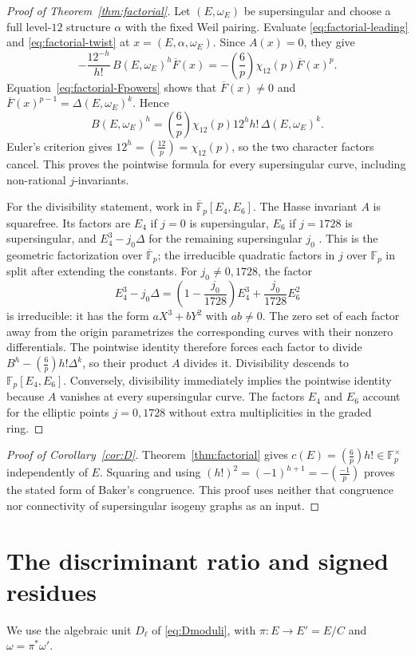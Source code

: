 \documentclass[11pt,a4paper]{article}
\numberwithin{equation}{section}
\theoremstyle{definition}
\theoremstyle{remark}
\newcommand{\Fp}{\mathbb F_p}
\newcommand{\Fb}{\overline{\mathbb F}_p}
\newcommand{\leg}[2]{\left(\frac{#1}{#2}\right)}
\newcommand{\Lp}[1]{\left(\frac{#1}{p}\right)}
\begin{document}
\begin{proof}[Proof of Theorem~\ref{thm:factorial}]
Let $(E,\omega_E)$ be supersingular and choose a full level-$12$
structure $\alpha$ with the fixed Weil pairing. Evaluate
\eqref{eq:factorial-leading} and \eqref{eq:factorial-twist} at
$x=(E,\alpha,\omega_E)$. Since $A(x)=0$, they give
\[
-\frac{12^{-h}}{h!}\,B(E,\omega_E)^h\overline F(x)
=-\Lp6\chi_{12}(p)\overline F(x)^p.
\]
Equation~\eqref{eq:factorial-Fpowers} shows that
$\overline F(x)\ne0$ and
$\overline F(x)^{p-1}=\Delta(E,\omega_E)^k$. Hence
\[
B(E,\omega_E)^h
=\Lp6\chi_{12}(p)12^h h!\,\Delta(E,\omega_E)^k.
\]
Euler's criterion gives $12^h=\leg{12}{p}=\chi_{12}(p)$,
so the two character factors cancel. This proves the pointwise formula
for every supersingular curve, including non-rational $j$-invariants.

For the divisibility statement, work in $\Fb[E_4,E_6]$.
The Hasse invariant $A$ is squarefree. Its factors are $E_4$ if
$j=0$ is supersingular, $E_6$ if $j=1728$ is supersingular, and
$E_4^3-j_0\Delta$ for the remaining supersingular $j_0$
\citep[\S3]{KZ98}. This is the geometric factorization over $\Fb$;
the irreducible quadratic factors in $j$ over $\Fp$ in
\citet[Theorem~1.2]{Baker98} split after extending the constants.
For $j_0\ne0,1728$, the factor
\[
E_4^3-j_0\Delta
=\left(1-\frac{j_0}{1728}\right)E_4^3
+\frac{j_0}{1728}E_6^2
\]
is irreducible: it has the form $aX^3+bY^2$ with $ab\ne0$.
The zero set of each factor away from the origin
parametrizes the corresponding curves with their nonzero differentials.
The pointwise identity therefore forces each factor to divide
$B^h-\Lp6h!\Delta^k$, so their product $A$ divides it.
Divisibility descends to $\Fp[E_4,E_6]$. Conversely, divisibility
immediately implies the pointwise identity because $A$ vanishes at every
supersingular curve. The factors $E_4$ and $E_6$ account for the elliptic
points $j=0,1728$ without extra multiplicities in the graded ring.
\end{proof}

\begin{proof}[Proof of Corollary~\ref{cor:D}]
Theorem~\ref{thm:factorial} gives $c(E)=\Lp6h!\in\Fp^\times$
independently of $E$. Squaring and using
$(h!)^2=(-1)^{h+1}=-\Lp{-1}$ proves the stated form of
Baker's congruence. This proof uses neither that congruence nor
connectivity of supersingular isogeny graphs as an input.
\end{proof}

\section{The discriminant ratio and signed residues}\label{sec:proof}
We use the algebraic unit $D_\ell$ of \eqref{eq:Dmoduli}, with
$\pi:E\to E'=E/C$ and $\omega=\pi^*\omega'$.
\end{document}
